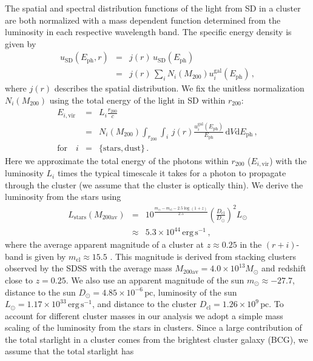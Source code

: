 \documentclass[10pt,aps,pra,reprint,amsmath,amsfonts,amssymb,showpacs,nofootinbib,floatfix]{revtex4-1}
\newcommand{\rmn}{\mathrm}
\newcommand{\ph}{\rmn{ph}}
\newcommand{\eph}{E_\ph}
\newcommand{\vir}{\rmn{vir}}
\newcommand{\gal}{\rmn{gal}}
\newcommand{\sd}{\rmn{SD}}
\newcommand{\clu}{\rmn{cl}}
\newcommand{\msun}{M_\odot}
\newcommand{\stars}{\rmn{stars}}
\newcommand{\dd}{\rmn{d}}
\newcommand{\rvir}{r_{200}}
\newcommand{\mvir}{M_{200}}
\begin{document}
The spatial and spectral distribution functions of the light from SD
in a cluster are both normalized with a mass dependent function
determined from the luminosity in each respective wavelength band. The
specific energy density is given by
\begin{eqnarray} 
u_\sd(\eph, r) &=& j(r)\,u_\sd(\eph) \nonumber\\
&=& j(r)\,\sum_i N_i(\mvir) u_i^\gal(\eph)\,,
\label{eq:u_SD}
\end{eqnarray}
where $j(r)$ describes the spatial distribution. We fix the unitless
normalization $N_i(\mvir)$ using the total energy of the light in SD
within $\rvir$:
\begin{eqnarray} 
  E_{i,\vir} &=& L_i \frac{\rvir}{c} \nonumber \\
  &=&N_i(\mvir)\int_{\rvir} \int_i \,j(r) 
  \frac{u_i^\gal(\eph)}{\eph}\,\dd V\dd \eph\,,\nonumber \\
 \rmn{for}\quad i&=&\{\rmn{stars,dust}\}\,.
\label{eq:E_SD}
\end{eqnarray}
Here we approximate the total energy of the photons within $\rvir$
($E_{i,\vir}$) with the luminosity $L_i$ \cite{2008A&A...490..547G}
times the typical timescale it takes for a photon to propagate through
the cluster (we assume that the cluster is optically thin). We derive
the luminosity from the stars using
\begin{eqnarray}
L_\stars(M_{200\rmn{av}})&=&10^{\frac{m_\odot-m_\rmn{cl}-2.5\log\left(1+z\right)}{2.5}}
\left(\frac{D_\clu}{D_\odot}\right)^2 L_\odot\nonumber\\
&\approx& 5.3\times10^{44}\,\rmn{erg}\,\rmn{s}^{-1}\,,
\label{eq:L_star}
\end{eqnarray}
where the average apparent magnitude of a cluster at $z\approx 0.25$
in the $(r+i)$-band is given by $m_\rmn{cl}\approx 15.5$
\cite{2005MNRAS.358..949Z}. This magnitude is derived from stacking
clusters observed by the SDSS with the average mass
$M_{200\rmn{av}}=4.0\times10^{13}\msun$ and redshift close to
$z=0.25$. We also use an apparent magnitude of the sun $m_\odot\approx
-27.7$, distance to the sun $D_\odot=4.85\times10^{-6}\,\rmn{pc}$,
luminosity of the sun $L_\odot=1.17\times10^{33}\,\rmn{erg\,s}^{-1}$,
and distance to the cluster $D_\clu=1.26\times10^9\,\rmn{pc}$. To
account for different cluster masses in our analysis we adopt a simple
mass scaling of the luminosity from the stars in clusters. Since a
large contribution of the total starlight in a cluster comes from the
brightest cluster galaxy (BCG), we assume that the total starlight has
\end{document}
